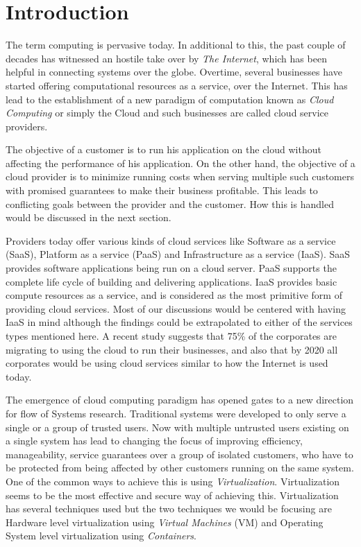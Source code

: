 \chapter{Introduction}
  
  The term computing is pervasive today. In additional to this, the past couple of decades has witnessed an hostile 
  take over by \textit{The Internet}, which has been helpful in connecting systems over the globe. 
  Overtime, several businesses have started offering computational resources as a service, over the Internet. This has lead to 
  the establishment of a new paradigm of computation known as \textit{Cloud Computing} or simply the Cloud and such businesses 
  are called cloud service providers. 

  The objective of a customer is to run his application on the cloud without affecting the performance of his application. On the 
other hand, the objective of a cloud provider is to minimize running costs when serving multiple such customers with promised guarantees to 
make their business profitable. This leads to conflicting goals between the provider and the customer. How this is handled would 
be discussed in the next section. 

Providers today offer various kinds of cloud services like Software as a service (SaaS), Platform as a service (PaaS) and Infrastructure as 
a service (IaaS). SaaS provides software applications being run on a cloud server. PaaS supports the complete life cycle of building and 
delivering applications. IaaS provides basic compute resources as a service, and is considered as the most primitive form of providing 
cloud services. Most of our discussions would be centered with having IaaS in mind although the findings could be extrapolated to either of 
the services types mentioned here. A recent study \cite{forbes} suggests that 75\% of the corporates are migrating to using the cloud to 
run their businesses, and also that by 2020 all corporates would be using cloud services similar to how the Internet is used today.   

  The emergence of cloud computing paradigm has opened gates to a new direction for flow of Systems research. Traditional systems were 
developed to only serve a single or a group of trusted users. Now with multiple untrusted users existing on a single system has 
lead to changing the focus of improving efficiency, manageability, service guarantees over a group of isolated customers, who have to be
protected from being affected by other customers running on the same system. One of the common ways to achieve this is using 
\textit{Virtualization}. Virtualization seems to be the most effective and secure way of achieving this. Virtualization has several 
techniques used but the two techniques we would be focusing are Hardware level virtualization using \textit{Virtual Machines} (VM) and 
Operating System level virtualization using \textit{Containers}.

